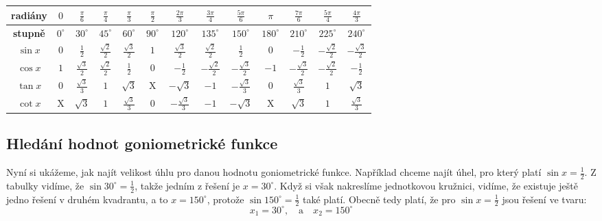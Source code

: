\documentclass[12pt,a4paper]{article}
\begin{document}
\begin{center}
\renewcommand{\arraystretch}{1.6}
\setlength{\tabcolsep}{6pt}

\begin{tabular}{|c||*{12}{c|}}
\hline
\textbf{radiány} 
& $0$ & $\frac{\pi}{6}$ & $\frac{\pi}{4}$ & $\frac{\pi}{3}$ & $\frac{\pi}{2}$ 
& $\frac{2\pi}{3}$ & $\frac{3\pi}{4}$ & $\frac{5\pi}{6}$ & $\pi$
& $\frac{7\pi}{6}$ & $\frac{5\pi}{4}$ & $\frac{4\pi}{3}$ \\
\hline
\textbf{stupně} 
& $0^\circ$ & $30^\circ$ & $45^\circ$ & $60^\circ$ & $90^\circ$
& $120^\circ$ & $135^\circ$ & $150^\circ$ & $180^\circ$
& $210^\circ$ & $225^\circ$ & $240^\circ$ \\
\hline

\textbf{$\sin x$} 
& $0$ & $\tfrac12$ & $\tfrac{\sqrt2}{2}$ & $\tfrac{\sqrt3}{2}$ & $1$
& $\tfrac{\sqrt3}{2}$ & $\tfrac{\sqrt2}{2}$ & $\tfrac12$ & $0$
& $-\tfrac12$ & $-\tfrac{\sqrt2}{2}$ & $-\tfrac{\sqrt3}{2}$ \\
\hline

\textbf{$\cos x$} 
& $1$ & $\tfrac{\sqrt3}{2}$ & $\tfrac{\sqrt2}{2}$ & $\tfrac12$ & $0$
& $-\tfrac12$ & $-\tfrac{\sqrt2}{2}$ & $-\tfrac{\sqrt3}{2}$ & $-1$
& $-\tfrac{\sqrt3}{2}$ & $-\tfrac{\sqrt2}{2}$ & $-\tfrac12$ \\
\hline

\textbf{$\tan x$} 
& $0$ & $\tfrac{\sqrt3}{3}$ & $1$ & $\sqrt3$ & X
& $-\sqrt3$ & $-1$ & $-\tfrac{\sqrt3}{3}$ & $0$
& $\tfrac{\sqrt3}{3}$ & $1$ & $\sqrt3$ \\
\hline

\textbf{$\cot x$} 
& X & $\sqrt3$ & $1$ & $\tfrac{\sqrt3}{3}$ & $0$
& $-\tfrac{\sqrt3}{3}$ & $-1$ & $-\sqrt3$ & X
& $\sqrt3$ & $1$ & $\tfrac{\sqrt3}{3}$ \\
\hline
\end{tabular}
\end{center}



\newpage
\subsection*{Hledání hodnot goniometrické funkce}
Nyní si ukážeme, jak najít velikost úhlu pro danou hodnotu goniometrické funkce.
Například chceme najít úhel, pro který platí $\sin x = \frac{1}{2}$.
Z tabulky vidíme, že $\sin 30^\circ = \frac{1}{2}$,
takže jedním z řešení je $x = 30^\circ$. Když si však nakreslíme jednotkovou kružnici,
vidíme, že existuje ještě jedno řešení v druhém kvadrantu, a to $x = 150^\circ$,
protože $\sin 150^\circ = \frac{1}{2}$ také platí. Obecně tedy platí, že pro $\sin x = \frac{1}{2}$
jsou řešení ve tvaru:
\[x_1 = 30^\circ, \quad \text{a} \quad  x_2 = 150^\circ\]
\end{document}
